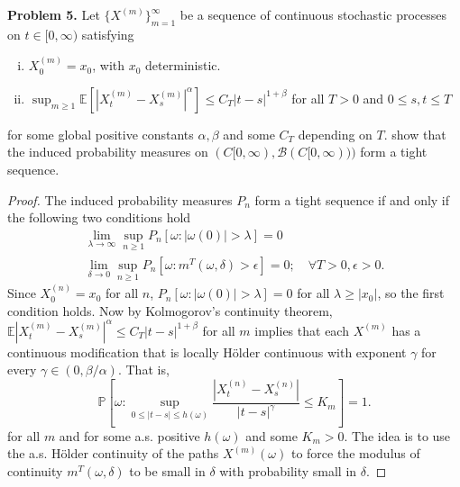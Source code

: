 \documentclass[11pt,letterpaper]{report}
\newcommand{\mcal}[1]{\mathcal{#1}}
\newcommand{\E}{\mathbb{E}}
\newcommand{\Prob}{\mathbb{P}}
\begin{document}
\noindent\textbf{Problem 5. }
Let $\{X^{(m)}\}_{m=1}^\infty$ be a sequence of continuous stochastic processes on $t\in [0, \infty)$ satisfying
\begin{enumerate}[(i)]
	\item $X^{(m)}_0 = x_0$, with $x_0$ deterministic.
	\item $\sup_{m\geq 1}\E[|X^{(m)}_t - X^{(m)}_s|^\alpha]\leq C_T|t-s|^{1+\beta}$ for all $T>0$ and $0\leq s,t\leq T$
\end{enumerate}
for some global positive constants $\alpha, \beta$ and some $C_T$ depending on $T$. show that the induced probability measures on $(C[0, \infty), \mcal{B}(C[0, \infty)))$ form a tight sequence.
\begin{proof}
	The induced probability measures $P_n$ form a tight sequence if and only if the following two conditions hold
	\begin{gather}
		\lim_{\lambda \to \infty}\sup_{n\geq 1}P_n[\omega: |\omega(0)|>\lambda] = 0\\
		\lim_{\delta\to 0}\sup_{n\geq 1}P_n[\omega: m^T(\omega, \delta)>\epsilon] = 0;\quad \forall T>0, \epsilon>0.
	\end{gather}
	Since $X^{(n)}_0 = x_0$ for all $n$, $P_n[\omega: |\omega(0)|>\lambda] = 0$ for all $\lambda \geq |x_0|$, so the first condition holds. Now by Kolmogorov's continuity theorem, $\E|X^{(m)}_t - X^{(m)}_s|^\alpha \leq C_T|t-s|^{1+\beta}$ for all $m$ implies that each $X^{(m)}$ has a continuous modification that is locally H\"older continuous with exponent $\gamma$ for every $\gamma\in (0, \beta/\alpha)$. That is,
	\[
	\Prob\left[\omega: \sup_{0\leq |t-s|\leq h(\omega)} \frac{|X^{(n)}_t - X^{(n)}_s|}{|t-s|^\gamma} \leq K_m\right] = 1.
	\]
	for all $m$ and for some a.s. positive $h(\omega)$ and some $K_m>0$. The idea is to use the a.s. H\"older continuity of the paths $X^{(m)}(\omega)$ to force the modulus of continuity $m^T(\omega, \delta)$ to be small in $\delta$ with probability small in $\delta$.
\end{proof}
\end{document}
